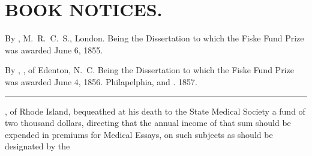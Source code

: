 \chapter*[Book Notices.]{BOOK NOTICES.}

\footnotesize
{}  By , M.~R.~C.~S., London. Being the Dissertation to which the Fiske Fund Prize was awarded June 6, 1855.

  By , \md, of Edenton, N.~C. Being the Dissertation to which the Fiske Fund Prize was awarded June 4, 1856. Philapelphia,  and . 1857.
\plainbreak{1}

\normalsize

, of Rhode Island, bequeathed at his death to the
State Medical Society a fund of two thousand dollars, directing that
the annual income of that sum should be expended in premiums for
Medical Essays, on such subjects as should be designated by the\endinput
